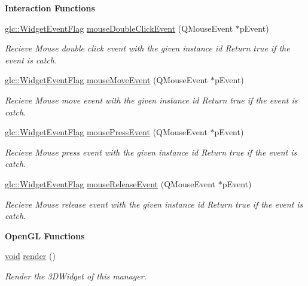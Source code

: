 \begin{Indent}{\bf Interaction Functions}\par
\begin{DoxyCompactItemize}
\item 
\hyperlink{namespaceglc_a7a4a1e3955352aeb2d018746fbe626d5}{glc\-::\-Widget\-Event\-Flag} \hyperlink{class_g_l_c__3_d_widget_manager_handle_ae3d33e8b17b10825f13b3510f8f50b4c}{mouse\-Double\-Click\-Event} (Q\-Mouse\-Event $\ast$p\-Event)
\begin{DoxyCompactList}\small\item\em Recieve Mouse double click event with the given instance id Return true if the event is catch. \end{DoxyCompactList}\item 
\hyperlink{namespaceglc_a7a4a1e3955352aeb2d018746fbe626d5}{glc\-::\-Widget\-Event\-Flag} \hyperlink{class_g_l_c__3_d_widget_manager_handle_a64f2cd9c781c5eac1041dd9e8e560446}{mouse\-Move\-Event} (Q\-Mouse\-Event $\ast$p\-Event)
\begin{DoxyCompactList}\small\item\em Recieve Mouse move event with the given instance id Return true if the event is catch. \end{DoxyCompactList}\item 
\hyperlink{namespaceglc_a7a4a1e3955352aeb2d018746fbe626d5}{glc\-::\-Widget\-Event\-Flag} \hyperlink{class_g_l_c__3_d_widget_manager_handle_ae6c4d4dd35b14718a86beccd770e646d}{mouse\-Press\-Event} (Q\-Mouse\-Event $\ast$p\-Event)
\begin{DoxyCompactList}\small\item\em Recieve Mouse press event with the given instance id Return true if the event is catch. \end{DoxyCompactList}\item 
\hyperlink{namespaceglc_a7a4a1e3955352aeb2d018746fbe626d5}{glc\-::\-Widget\-Event\-Flag} \hyperlink{class_g_l_c__3_d_widget_manager_handle_a230d0ef8f7ade31c7063491476fa2c5a}{mouse\-Release\-Event} (Q\-Mouse\-Event $\ast$p\-Event)
\begin{DoxyCompactList}\small\item\em Recieve Mouse release event with the given instance id Return true if the event is catch. \end{DoxyCompactList}\end{DoxyCompactItemize}
\end{Indent}
\begin{Indent}{\bf Open\-G\-L Functions}\par
\begin{DoxyCompactItemize}
\item 
\hyperlink{group___u_a_v_objects_plugin_ga444cf2ff3f0ecbe028adce838d373f5c}{void} \hyperlink{class_g_l_c__3_d_widget_manager_handle_a496db7147214c8737d4e42cb3ac9ba17}{render} ()
\begin{DoxyCompactList}\small\item\em Render the 3\-D\-Widget of this manager. \end{DoxyCompactList}\end{DoxyCompactItemize}
\end{Indent}


